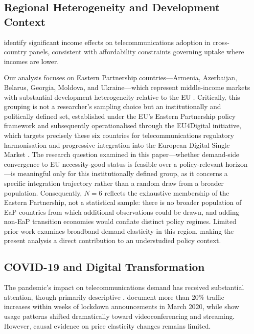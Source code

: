 \subsection{Regional Heterogeneity and Development Context}

\citet{roller2001telecommunications} identify significant income effects on telecommunications adoption in cross-country panels, consistent with affordability constraints governing uptake where incomes are lower.

Our analysis focuses on Eastern Partnership countries---Armenia, Azerbaijan, Belarus, 
Georgia, Moldova, and Ukraine---which represent 
middle-income markets with substantial development 
heterogeneity relative to the EU \citep{ecorys2013evaluation}. Critically, 
this grouping is not a researcher's 
sampling choice but an institutionally and politically defined set, 
established under the EU's Eastern Partnership policy framework and 
subsequently operationalised through the EU4Digital initiative, 
which targets precisely these six countries for telecommunications regulatory 
harmonisation and progressive integration into the European Digital Single Market \citep{european2021eap}. The research question examined in this paper---whether demand-side convergence to EU necessity-good status is feasible over a policy-relevant horizon---is meaningful only for this institutionally defined group, as it concerns a specific integration trajectory rather than a random draw from a broader population. Consequently, $N{=}6$ reflects the exhaustive membership of the Eastern Partnership, not a statistical sample: there is no broader population of EaP countries from which additional observations could be drawn, and adding non-EaP transition economies would conflate distinct policy regimes. Limited prior work examines broadband demand elasticity in this region, making the present analysis a direct contribution to an understudied policy context.

\subsection{COVID-19 and Digital Transformation}

The pandemic's impact on telecommunications demand has received substantial attention, though primarily descriptive \citep{oecd2021covid, iab2020internet}. \citet{feldmann2021year} document more than 20\% traffic increases within weeks of lockdown announcements in March 2020, while \citet{favale2020campus} show usage patterns shifted dramatically toward videoconferencing and streaming. However, causal evidence on price elasticity changes remains limited.

